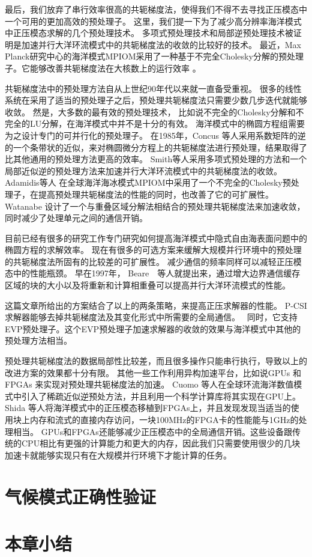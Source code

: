  
最后，我们放弃了串行效率很高的共轭梯度法，使得我们不得不去寻找正压模态中一个可用的更加高效的预处理子。 
这里，我们提一下为了减少高分辨率海洋模式中正压模态求解的几个预处理技术。 
多项式预处理技术和局部逆预处理技术被证明是加速并行大洋环流模式中的共轭梯度法的收敛的比较好的技术\cite{smith1992parallel}。 
最近，Max Planck研究中心的海洋模式MPIOM采用了一种基于不完全Cholesky分解的预处理子。它能够改善共轭梯度法在大核数上的运行效率 \cite{adamidis2011high}。


  
共轭梯度法中的预处理方法自从上世纪90年代以来就一直备受重视。 
很多的线性系统在采用了适当的预处理子之后，预处理共轭梯度法只需要少数几步迭代就能够收敛。 
然是，大多数的最有效的预处理技术， 比如说不完全的Cholesky分解和不完全的LU分解，在海洋模式中并不是十分的有效。 
海洋模式中的椭圆方程组需要为之设计专门的可并行化的预处理子。 
在1985年，Concus 等人\cite{concus1985block}采用系数矩阵的逆的一个条带状的近似，来对椭圆微分方程上的共轭梯度法进行预处理，结果取得了比其他通用的预处理方法更高的效率。 
Smith等人\cite{smith1992parallel}采用多项式预处理的方法和一个局部近似逆的预处理方法来加速并行大洋环流模式中的共轭梯度法的收敛。 
Adamidis等人 \cite{adamidis2011high} 在全球海洋海冰模式MPIOM中采用了一个不完全的Cholesky预处理子，在提高预处理共轭梯度法的性能的同时，也改善了它的可扩展性。 
Watanabe \cite{Watanabe2006pcg} 设计了一个与重叠区域分解法相结合的预处理共轭梯度法来加速收敛，同时减少了处理单元之间的通信开销。 




    
目前已经有很多的研究工作专门研究如何提高海洋模式中隐式自由海表面问题中的椭圆方程的求解效率。 
现在有很多的可选方案来缓解大规模并行环境中的预处理的共轭梯度法所固有的比较差的可扩展性。 
 减少通信的频率同样可以减轻正压模态中的性能瓶颈。 
 早在1997年，  Beare　\cite{beare1997optimisation}等人就提出来，通过增大边界通信缓存区域的块的大小以及将重新和计算相重叠可以提高并行大洋环流模式的性能。 
  

这篇文章所给出的方案结合了以上的两条策略，来提高正压求解器的性能。 
P-CSI求解器能够去掉共轭梯度法及其变化形式中所需要的全局通信。　
同时，它支持EVP预处理子。这个EVP预处理子加速求解器的收敛的效果与海洋模式中其他的预处理方法相当。 



预处理共轭梯度法的数据局部性比较差，而且很多操作只能串行执行，导致以上的改进方案的效果都十分有限。 
其他一些工作利用异构加速平台，比如说GPUs \cite{cuomo2012pcg} 和FPGAs \cite{Shida2007}来实现对预处理共轭梯度法的加速。 
Cuomo 等人\cite{cuomo2012pcg}在全球环流海洋数值模式中引入了稀疏近似逆预处方法，并且利用一个科学计算库将其实现在GPU上。 
Shida 等人\cite{Shida2007}将海洋模式中的正压模态移植到FPGAs上，并且发现发现当适当的使用块上内存和流式的直接内存访问，一块100MHz的FPGA卡的性能能与1GHz的处理相当。 
GPUs和FPGAs还能够减少正压模态中的全局通信开销。这些设备跟传统的CPU相比有更强的计算能力和更大的内存，因此我们只需要使用很少的几块加速卡就能够实现只有在大规模并行环境下才能计算的任务。

\section{气候模式正确性验证}
\label{related:veify}


\section{本章小结}
\label{related:Conclude}